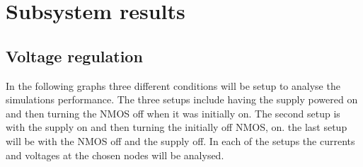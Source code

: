 \chapter{Subsystem results}\label{chap:res}
\section{Voltage regulation}
In the following graphs three different conditions will be setup to analyse the simulations performance. The three setups include having the supply powered on and then turning the NMOS off when it was initially on. The second setup is with the supply on and then turning the initially off NMOS, on. the last setup will be with the NMOS off and the supply off. In each of the setups the currents and voltages at the chosen nodes will be analysed.

